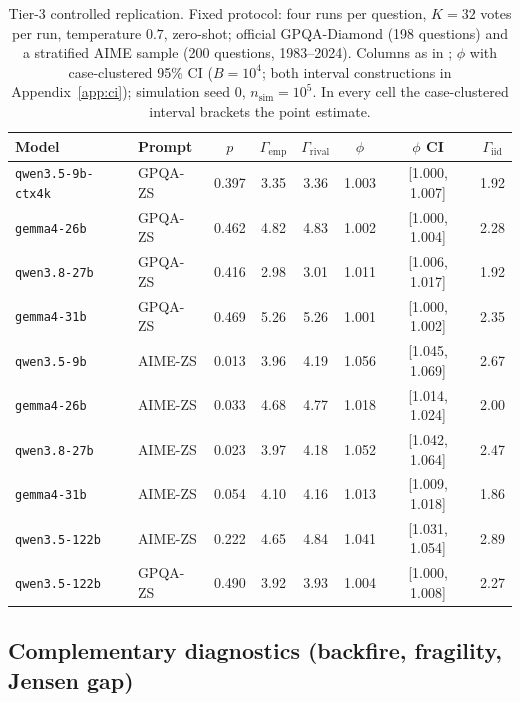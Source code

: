 \documentclass[a4paper,fleqn]{cas-sc}
\newcommand{\agreementIndex}{\Gamma}
\begin{document}
\begin{table}[t]\begin{minipage}{\linewidth}
\centering
\caption{Tier-3 controlled replication. Fixed protocol: four runs per
question, $K=32$ votes per run, temperature $0.7$, zero-shot; official
GPQA-Diamond (198 questions) and a stratified AIME sample (200 questions,
1983--2024). Columns as in ; $\phi$ with case-clustered
95\% CI ($B=10^4$; both interval constructions in
Appendix~\ref{app:ci}); simulation seed 0, $n_{\mathrm{sim}}=10^5$. In
every cell the case-clustered interval brackets the point estimate.}
\label{tab:tier3}
\begin{tabular}{llcccccc}
\toprule
Model & Prompt & $p$ & $\agreementIndex_{\mathrm{emp}}$ & $\agreementIndex_{\mathrm{rival}}$ & $\phi$ & $\phi$ CI & $\agreementIndex_{\mathrm{iid}}$ \\
\midrule
\texttt{qwen3.5-9b-ctx4k} & GPQA-ZS & 0.397 & 3.35 & 3.36 & 1.003 & [1.000, 1.007] & 1.92 \\
\texttt{gemma4-26b} & GPQA-ZS & 0.462 & 4.82 & 4.83 & 1.002 & [1.000, 1.004] & 2.28 \\
\texttt{qwen3.8-27b} & GPQA-ZS & 0.416 & 2.98 & 3.01 & 1.011 & [1.006, 1.017] & 1.92 \\
\texttt{gemma4-31b} & GPQA-ZS & 0.469 & 5.26 & 5.26 & 1.001 & [1.000, 1.002] & 2.35 \\
\texttt{qwen3.5-9b} & AIME-ZS & 0.013 & 3.96 & 4.19 & 1.056 & [1.045, 1.069] & 2.67 \\
\texttt{gemma4-26b} & AIME-ZS & 0.033 & 4.68 & 4.77 & 1.018 & [1.014, 1.024] & 2.00 \\
\texttt{qwen3.8-27b} & AIME-ZS & 0.023 & 3.97 & 4.18 & 1.052 & [1.042, 1.064] & 2.47 \\
\texttt{gemma4-31b} & AIME-ZS & 0.054 & 4.10 & 4.16 & 1.013 & [1.009, 1.018] & 1.86 \\
\texttt{qwen3.5-122b} & AIME-ZS & 0.222 & 4.65 & 4.84 & 1.041 & [1.031, 1.054] & 2.89 \\
\texttt{qwen3.5-122b} & GPQA-ZS & 0.490 & 3.92 & 3.93 & 1.004 & [1.000, 1.008] & 2.27 \\
\bottomrule
\end{tabular}
\end{minipage}\end{table}


\subsection{Complementary diagnostics (backfire, fragility, Jensen gap)}
\label{sec:res-backfire}
\end{document}
